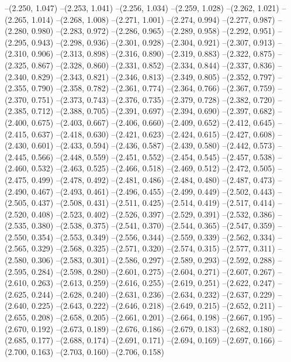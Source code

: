 --(2.250, 1.047)
--(2.253, 1.041)
--(2.256, 1.034)
--(2.259, 1.028)
--(2.262, 1.021)
--(2.265, 1.014)
--(2.268, 1.008)
--(2.271, 1.001)
--(2.274, 0.994)
--(2.277, 0.987)
--(2.280, 0.980)
--(2.283, 0.972)
--(2.286, 0.965)
--(2.289, 0.958)
--(2.292, 0.951)
--(2.295, 0.943)
--(2.298, 0.936)
--(2.301, 0.928)
--(2.304, 0.921)
--(2.307, 0.913)
--(2.310, 0.906)
--(2.313, 0.898)
--(2.316, 0.890)
--(2.319, 0.883)
--(2.322, 0.875)
--(2.325, 0.867)
--(2.328, 0.860)
--(2.331, 0.852)
--(2.334, 0.844)
--(2.337, 0.836)
--(2.340, 0.829)
--(2.343, 0.821)
--(2.346, 0.813)
--(2.349, 0.805)
--(2.352, 0.797)
--(2.355, 0.790)
--(2.358, 0.782)
--(2.361, 0.774)
--(2.364, 0.766)
--(2.367, 0.759)
--(2.370, 0.751)
--(2.373, 0.743)
--(2.376, 0.735)
--(2.379, 0.728)
--(2.382, 0.720)
--(2.385, 0.712)
--(2.388, 0.705)
--(2.391, 0.697)
--(2.394, 0.690)
--(2.397, 0.682)
--(2.400, 0.675)
--(2.403, 0.667)
--(2.406, 0.660)
--(2.409, 0.652)
--(2.412, 0.645)
--(2.415, 0.637)
--(2.418, 0.630)
--(2.421, 0.623)
--(2.424, 0.615)
--(2.427, 0.608)
--(2.430, 0.601)
--(2.433, 0.594)
--(2.436, 0.587)
--(2.439, 0.580)
--(2.442, 0.573)
--(2.445, 0.566)
--(2.448, 0.559)
--(2.451, 0.552)
--(2.454, 0.545)
--(2.457, 0.538)
--(2.460, 0.532)
--(2.463, 0.525)
--(2.466, 0.518)
--(2.469, 0.512)
--(2.472, 0.505)
--(2.475, 0.499)
--(2.478, 0.492)
--(2.481, 0.486)
--(2.484, 0.480)
--(2.487, 0.473)
--(2.490, 0.467)
--(2.493, 0.461)
--(2.496, 0.455)
--(2.499, 0.449)
--(2.502, 0.443)
--(2.505, 0.437)
--(2.508, 0.431)
--(2.511, 0.425)
--(2.514, 0.419)
--(2.517, 0.414)
--(2.520, 0.408)
--(2.523, 0.402)
--(2.526, 0.397)
--(2.529, 0.391)
--(2.532, 0.386)
--(2.535, 0.380)
--(2.538, 0.375)
--(2.541, 0.370)
--(2.544, 0.365)
--(2.547, 0.359)
--(2.550, 0.354)
--(2.553, 0.349)
--(2.556, 0.344)
--(2.559, 0.339)
--(2.562, 0.334)
--(2.565, 0.329)
--(2.568, 0.325)
--(2.571, 0.320)
--(2.574, 0.315)
--(2.577, 0.311)
--(2.580, 0.306)
--(2.583, 0.301)
--(2.586, 0.297)
--(2.589, 0.293)
--(2.592, 0.288)
--(2.595, 0.284)
--(2.598, 0.280)
--(2.601, 0.275)
--(2.604, 0.271)
--(2.607, 0.267)
--(2.610, 0.263)
--(2.613, 0.259)
--(2.616, 0.255)
--(2.619, 0.251)
--(2.622, 0.247)
--(2.625, 0.244)
--(2.628, 0.240)
--(2.631, 0.236)
--(2.634, 0.232)
--(2.637, 0.229)
--(2.640, 0.225)
--(2.643, 0.222)
--(2.646, 0.218)
--(2.649, 0.215)
--(2.652, 0.211)
--(2.655, 0.208)
--(2.658, 0.205)
--(2.661, 0.201)
--(2.664, 0.198)
--(2.667, 0.195)
--(2.670, 0.192)
--(2.673, 0.189)
--(2.676, 0.186)
--(2.679, 0.183)
--(2.682, 0.180)
--(2.685, 0.177)
--(2.688, 0.174)
--(2.691, 0.171)
--(2.694, 0.169)
--(2.697, 0.166)
--(2.700, 0.163)
--(2.703, 0.160)
--(2.706, 0.158)
